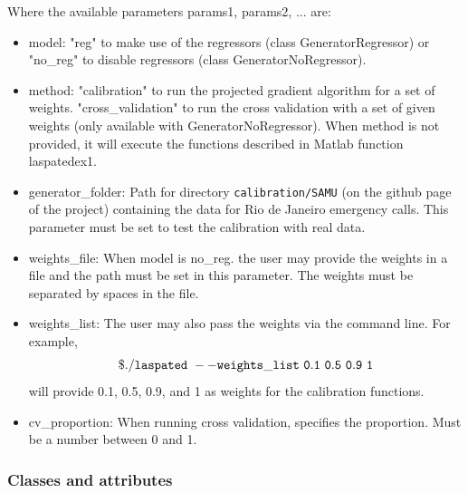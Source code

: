 \documentclass[article]{jss}
\begin{document}
{Where the available parameters params1, params2, ... are:

\begin{itemize}
    \item model: "reg" to make use of the regressors (class GeneratorRegressor) or "no\_reg" to disable regressors (class GeneratorNoRegressor).
    \item method: "calibration" to run the projected gradient algorithm for a set of weights. "cross\_validation" to run the cross validation with a set of given weights (only available with GeneratorNoRegressor). When method is not provided, it will
    execute the functions described
    in Matlab function
     laspatedex1.
    \item generator\_folder: Path for
    directory {\tt{calibration/SAMU}}
    (on the github page of the project) containing the data for Rio de Janeiro emergency calls. This parameter must be set to test the calibration
    with real data.
    \item weights\_file: When model is no\_reg. the user may provide the weights in a file and the path must be set in this parameter. The weights must be separated by spaces in the file.
    \item weights\_list: The user may also pass the weights via the command line. For example, 
    $${\tt{\$./laspated\text{ }--weights\_list \text{ }0.1\text{ }0.5\text{ } 0.9\text{ } 1}}$$ will provide 0.1, 0.5, 0.9, and 1 as weights for the calibration functions.
    \item cv\_proportion: When running cross validation, specifies the proportion. Must be a number between 0 and 1.
\end{itemize}


\subsubsection{Classes and attributes}

}
\end{document}
